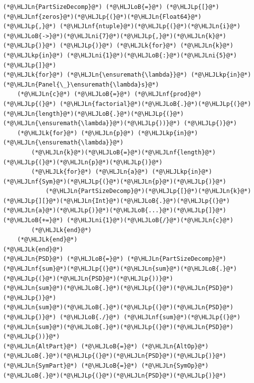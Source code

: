 \documentclass[12pt,a4paper]{article}
\newcommand{\HLJLk}[1]{\textcolor[RGB]{148,91,176}{\textbf{#1}}}
\newcommand{\HLJLkp}[1]{\textcolor[RGB]{148,91,176}{\textbf{#1}}}
\newcommand{\HLJLn}[1]{#1}
\newcommand{\HLJLnf}[1]{\textcolor[RGB]{66,102,213}{#1}}
\newcommand{\HLJLni}[1]{\textcolor[RGB]{59,151,46}{#1}}
\newcommand{\HLJLoB}[1]{\textcolor[RGB]{102,102,102}{\textbf{#1}}}
\newcommand{\HLJLp}[1]{#1}
\begin{document}
\begin{lstlisting}
(*@\HLJLn{PartSizeDecomp}@*) (*@\HLJLoB{=}@*) (*@\HLJLp{[}@*)(*@\HLJLnf{zeros}@*)(*@\HLJLp{(}@*)(*@\HLJLn{Float64}@*)(*@\HLJLp{,}@*) (*@\HLJLnf{ntuple}@*)(*@\HLJLp{(}@*)(*@\HLJLn{i}@*)(*@\HLJLoB{->}@*)(*@\HLJLni{7}@*)(*@\HLJLp{,}@*)(*@\HLJLn{k}@*)(*@\HLJLp{)}@*) (*@\HLJLp{)}@*) (*@\HLJLk{for}@*) (*@\HLJLn{k}@*) (*@\HLJLkp{in}@*) (*@\HLJLni{1}@*)(*@\HLJLoB{:}@*)(*@\HLJLni{5}@*)(*@\HLJLp{]}@*)
(*@\HLJLk{for}@*) (*@\HLJLn{\ensuremath{\lambda}}@*) (*@\HLJLkp{in}@*) (*@\HLJLn{Panel{\_}\ensuremath{\lambda}s}@*)
	(*@\HLJLn{c}@*) (*@\HLJLoB{=}@*) (*@\HLJLnf{prod}@*)(*@\HLJLp{(}@*) (*@\HLJLn{factorial}@*)(*@\HLJLoB{.}@*)(*@\HLJLp{(}@*)(*@\HLJLn{length}@*)(*@\HLJLoB{.}@*)(*@\HLJLp{(}@*)(*@\HLJLn{\ensuremath{\lambda}}@*)(*@\HLJLp{))}@*) (*@\HLJLp{)}@*)
	(*@\HLJLk{for}@*) (*@\HLJLn{p}@*) (*@\HLJLkp{in}@*) (*@\HLJLn{\ensuremath{\lambda}}@*)
		(*@\HLJLn{k}@*)(*@\HLJLoB{=}@*)(*@\HLJLnf{length}@*)(*@\HLJLp{(}@*)(*@\HLJLn{p}@*)(*@\HLJLp{)}@*)
		(*@\HLJLk{for}@*) (*@\HLJLn{a}@*) (*@\HLJLkp{in}@*) (*@\HLJLnf{Sym}@*)(*@\HLJLp{(}@*)(*@\HLJLn{p}@*)(*@\HLJLp{)}@*)
			(*@\HLJLn{PartSizeDecomp}@*)(*@\HLJLp{[}@*)(*@\HLJLn{k}@*)(*@\HLJLp{][}@*)(*@\HLJLn{Int}@*)(*@\HLJLoB{.}@*)(*@\HLJLp{(}@*)(*@\HLJLn{a}@*)(*@\HLJLp{)}@*)(*@\HLJLoB{...}@*)(*@\HLJLp{]}@*) (*@\HLJLoB{+=}@*) (*@\HLJLni{1}@*)(*@\HLJLoB{/}@*)(*@\HLJLn{c}@*)
		(*@\HLJLk{end}@*)
	(*@\HLJLk{end}@*)
(*@\HLJLk{end}@*)
(*@\HLJLn{PSD}@*) (*@\HLJLoB{=}@*) (*@\HLJLn{PartSizeDecomp}@*)
(*@\HLJLnf{sum}@*)(*@\HLJLp{(}@*)(*@\HLJLn{sum}@*)(*@\HLJLoB{.}@*)(*@\HLJLp{(}@*)(*@\HLJLn{PSD}@*)(*@\HLJLp{))}@*)
(*@\HLJLn{sum}@*)(*@\HLJLoB{.}@*)(*@\HLJLp{(}@*)(*@\HLJLn{PSD}@*)(*@\HLJLp{)}@*)
(*@\HLJLn{sum}@*)(*@\HLJLoB{.}@*)(*@\HLJLp{(}@*)(*@\HLJLn{PSD}@*)(*@\HLJLp{)}@*) (*@\HLJLoB{./}@*) (*@\HLJLnf{sum}@*)(*@\HLJLp{(}@*)(*@\HLJLn{sum}@*)(*@\HLJLoB{.}@*)(*@\HLJLp{(}@*)(*@\HLJLn{PSD}@*)(*@\HLJLp{))}@*)
(*@\HLJLn{AltPart}@*) (*@\HLJLoB{=}@*) (*@\HLJLn{AltOp}@*)(*@\HLJLoB{.}@*)(*@\HLJLp{(}@*)(*@\HLJLn{PSD}@*)(*@\HLJLp{)}@*)
(*@\HLJLn{SymPart}@*) (*@\HLJLoB{=}@*) (*@\HLJLn{SymOp}@*)(*@\HLJLoB{.}@*)(*@\HLJLp{(}@*)(*@\HLJLn{PSD}@*)(*@\HLJLp{)}@*)


\end{lstlisting}
\end{document}
